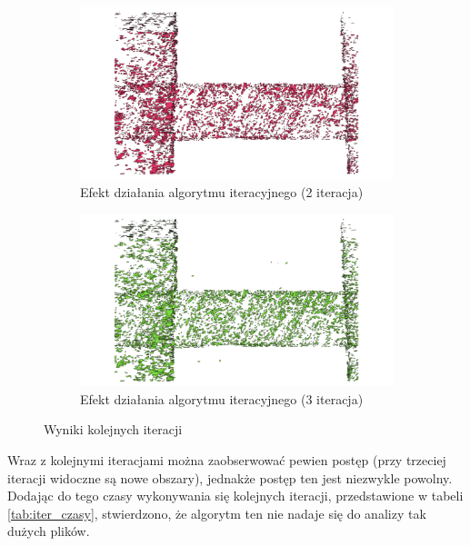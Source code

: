 \begin{figure}[h!]
    \centering
    \begin{subfigure}[b]{0.5\linewidth}
        \includegraphics[width=\linewidth]{img/wynik_iter2.png}
        \caption{Efekt działania algorytmu iteracyjnego (2 iteracja)}
    \end{subfigure}%
    \begin{subfigure}[b]{0.5\linewidth}
        \includegraphics[width=\linewidth]{img/wynik_iter3.png}
        \caption{Efekt działania algorytmu iteracyjnego (3 iteracja)}
    \end{subfigure}%
    \caption{Wyniki kolejnych iteracji}
    \label{fig:wynik_naiwny_las}
\end{figure}

Wraz z kolejnymi iteracjami można zaobserwować pewien postęp (przy trzeciej iteracji
widoczne są nowe obszary), jednakże postęp ten jest niezwykle powolny. Dodając do tego
czasy wykonywania się kolejnych iteracji, przedstawione w tabeli \ref{tab:iter_czasy},
stwierdzono, że algorytm ten nie nadaje się do analizy tak dużych plików.

